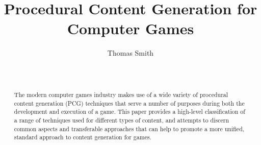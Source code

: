 \documentclass{acm_proc_article-sp}
\begin{document}
\title{Procedural Content Generation for Computer Games}

\author{
\alignauthor
Thomas Smith\\
       \\
       \\
}

\maketitle
\begin{abstract}
The modern computer games industry makes use of a wide variety of procedural content generation (PCG) techniques that serve a number of purposes during both the development and execution of a game. This paper provides a high-level classification of a range of techniques used for different types of content, and attempts to discern common aspects and transferable approaches that can help to promote a more unified, standard approach to content generation for games. 






\end{abstract}
\end{document}
